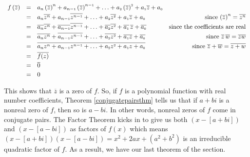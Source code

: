 \documentclass{ximera}
\begin{document}
\[ \begin{array}{rclr}

 f\left(\overline{z}\right) & = &  a_{n} \left(\overline{z}\right)^{n} + a_{n-\mbox{\tiny$1$}} \left(\overline{z}\right)^{n-\mbox{\tiny$1$}} + \ldots + a_{\mbox{\tiny $2$}}\left( \overline{z}\right)^{\mbox{\tiny $2$}} + a_{\mbox{\tiny $1$}} \overline{z} + a_{\mbox{\tiny $0$}} & \\ [3pt]
 
 &  = & a_{n}\overline{z^{n}} + a_{n-\mbox{\tiny$1$}}\overline{z^{n-\mbox{\tiny$1$}}} + \ldots + a_{\mbox{\tiny $2$}}\overline{z^{\mbox{\tiny $2$}}} + a_{\mbox{\tiny $1$}} \overline{z} + a_{\mbox{\tiny $0$}} & \mbox{ since $\left(\overline{z}\right)^n = \overline{z^{n}}$}\\ [3pt]
 
 & = & \overline{a_{n}}\overline{z^{n}} + \overline{a_{n-\mbox{\tiny$1$}}}\overline{z^{n-\mbox{\tiny$1$}}} + \ldots +  \overline{a_{\mbox{\tiny $2$}}}\overline{z^{\mbox{\tiny $2$}}} + \overline{a_{\mbox{\tiny $1$}}}\, \overline{z} + \overline{a_{\mbox{\tiny $0$}}} & \mbox{since the coefficients are real} \\ [3pt]
 
 & = & \overline{a_{n} z^{n}} + \overline{a_{n-\mbox{\tiny$1$}} z^{n-\mbox{\tiny$1$}}} + \ldots +  \overline{a_{\mbox{\tiny $2$}} z^{\mbox{\tiny $2$}}} + \overline{a_{\mbox{\tiny $1$}} z} + \overline{a_{\mbox{\tiny $0$}}} &  \mbox{ since $\overline{z} \, \overline{w}=\overline{zw} $}\\ [3pt]
 
 & = & \overline{a_{n} z^{n} + a_{n-\mbox{\tiny$1$}} z^{n-\mbox{\tiny$1$}} + \ldots + a_{\mbox{\tiny $2$}} z^{\mbox{\tiny $2$}} + a_{\mbox{\tiny $1$}} z + a_{\mbox{\tiny $0$}}} & \mbox{ since $ \overline{z} + \overline{w} = \overline{z+w} $}\\ [3pt]
 
 & = & \overline{f(z)} & \\ [3pt]
 
 & = & \overline{0} & \\ [3pt]
 
 & = & 0 & \\
 
\end{array} \]

This shows that $\overline{z}$ is a zero of $f$.  So, if $f$ is a polynomial function with real number coefficients, Theorem \ref{conjugatepairsthm} tells us that if $a+bi$ is a nonreal zero of $f$, then so is $a-bi$.  In other words, nonreal zeros of $f$ come in conjugate pairs.  The Factor Theorem kicks in to give us both $(x-[a+bi])$ and $(x-[a-bi])$ as factors of $f(x)$ which means $(x-[a+bi])(x-[a-bi]) = x^2 + 2a x + \left(a^2+b^2\right)$ is an irreducible quadratic factor of $f$.  As a result, we have our last theorem of the section.
\end{document}
